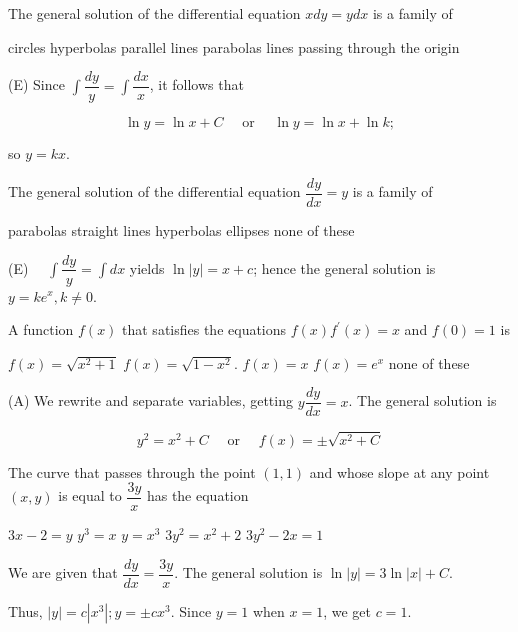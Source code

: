 \question
The general solution of the differential equation $x d y=y d x$ is a family of
\begin{choices}
  \choice circles
  \choice hyperbolas
  \choice parallel lines
  \choice parabolas
  \CorrectChoice lines passing through the origin
\end{choices}
\begin{solution}
(E) Since $\int \dfrac{d y}{y}=\int \dfrac{d x}{x}$, it follows that

\[
\ln y=\ln x+C \quad \text { or } \quad \ln y=\ln x+\ln k ;
\]

so $y=k x$.
\end{solution}

\question
The general solution of the differential equation $\dfrac{d y}{d x}=y$ is a family of
\begin{choices}
  \choice parabolas
  \choice straight lines
  \choice hyperbolas
  \choice ellipses
  \CorrectChoice none of these
\end{choices}
\begin{solution}
(E) $\quad \int \dfrac{d y}{y}=\int d x$ yields $\ln |y|=x+c$; hence the general solution is $y=k e^{x}, k \neq 0$.
\end{solution}


\newpage



\question
A function $f(x)$ that satisfies the equations $f(x) f^{\prime}(x)=x$ and $f(0)=1$ is
\begin{choices}
  \CorrectChoice $f(x)=\sqrt{x^{2}+1}$
  \choice $f(x)=\sqrt{1-x^{2}}$.
  \choice $f(x)=x$
  \choice $f(x)=e^{x}$
  \choice none of these
\end{choices}
\begin{solution}
(A) We rewrite and separate variables, getting $y \dfrac{d y}{d x}=x$. The general solution is

\[
y^{2}=x^{2}+C \quad \text { or } \quad f(x)= \pm \sqrt{x^{2}+C}
\]


\end{solution}

\question\label{calc09:curve-3y-x}
The curve that passes through the point $(1,1)$ and whose slope at any point $(x, y)$ is equal to $\dfrac{3 y}{x}$ has the equation
\begin{choices}
  \choice $3 x-2=y$
  \choice $y^{3}=x$
  \CorrectChoice $y=x^{3}$
  \choice $3 y^{2}=x^{2}+2$
  \choice $3 y^{2}-2 x=1$
\end{choices}
\begin{solution}
We are given that $\dfrac{d y}{d x}=\dfrac{3 y}{x}$. The general solution is $\ln |y|=3 \ln |x|+C$.


Thus, $|y|=c\left|x^{3}\right| ; y= \pm c x^{3}$. Since $y=1$ when $x=1$, we get $c=1$.
\end{solution}

